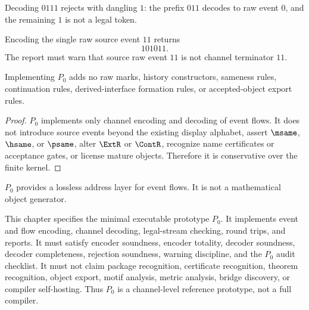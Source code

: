 \begin{example}
\label{ex:minimal-prototype-session-reject-invalid}
Decoding $0111$ rejects with dangling $1$: the prefix $011$ decodes to raw event $0$, and the remaining $1$ is not a legal token.
\end{example}

\begin{example}
\label{ex:minimal-prototype-session-source-11}
Encoding the single raw source event $11$ returns
$$
  101011.
$$
The report must warn that source raw event $11$ is not channel terminator $11$.
\end{example}

\begin{theorem}
\label{thm:minimal-prototype-conservative}
Implementing $P_0$ adds no raw marks, history constructors, sameness rules, continuation rules, derived-interface formation rules, or accepted-object export rules.
\end{theorem}

\begin{proof}
$P_0$ implements only channel encoding and decoding of event flows. It does not introduce source events beyond the existing display alphabet, assert $\msame$, $\hsame$, or $\psame$, alter $\ExtR$ or $\ContR$, recognize name certificates or acceptance gates, or license mature objects. Therefore it is conservative over the finite kernel.
\end{proof}

\begin{corollary}
\label{cor:minimal-prototype-address-layer}
$P_0$ provides a lossless address layer for event flows. It is not a mathematical object generator.
\end{corollary}

\begin{remark}[Summary]
\label{rem:minimal-prototype-summary}
This chapter specifies the minimal executable prototype $P_0$. It implements event and flow encoding, channel decoding, legal-stream checking, round trips, and reports. It must satisfy encoder soundness, encoder totality, decoder soundness, decoder completeness, rejection soundness, warning discipline, and the $P_0$ audit checklist. It must not claim package recognition, certificate recognition, theorem recognition, object export, motif analysis, metric analysis, bridge discovery, or compiler self-hosting. Thus $P_0$ is a channel-level reference prototype, not a full compiler.
\end{remark}
